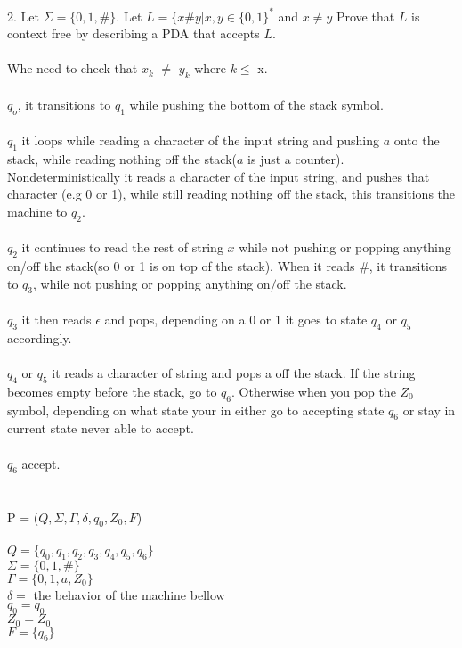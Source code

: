 \documentclass[11pt, oneside]{article}   	%
\begin{document}
\\
\\2. Let $\Sigma = \{ 0,1,\# \}$. Let $L = \{ x \# y | x,y \in \{ 0,1 \}^*$ and $x \neq y$ Prove that $L$ is context free by describing a PDA that accepts $L$.
\\
\\Whe need to check that $x_k$ $\neq$ $y_k$ where $k \leq$ x.
\\
\\$q_o$, it transitions to $q_1$ while pushing the bottom of the stack symbol. 
\\
\\$q_1$ it loops while reading a character of the input string and pushing $a$ onto the stack, while reading nothing off the stack($a$ is just a counter). Nondeterministically it reads a character of the input string, and pushes that character (e.g 0 or 1), while still reading nothing off the stack, this transitions the machine to $q_2$. 
\\
\\$q_2$ it continues to read the rest of string $x$ while not pushing or popping anything on/off the stack(so 0 or 1 is on top of the stack). When it reads $\#$, it transitions to $q_3$, while not pushing or popping anything on$/$off the stack. 
\\
\\$q_3$ it then reads $\epsilon$ and pops, depending on a 0 or 1 it goes to state $q_4$ or $q_5$ accordingly. 
\\
\\$q_4$ or $q_5$ it reads a character of string and pops a off the stack. If the string becomes empty before the stack, go to $q_6$. Otherwise when you pop the $Z_0$ symbol, depending on what state your in either go to accepting state $q_6$ or stay in current state never able to accept.
\\
\\$q_6$ accept.
\\
\\
\\P = ($Q,\Sigma,\Gamma, \delta,q_0,Z_0,F$)
\\
\\$Q =\{q_0,q_1,q_2,q_3,q_4,q_5,q_6\}$
\\$\Sigma = \{ 0,1,\# \}$
\\$\Gamma = \{ 0,1,a, Z_0\}$
\\$\delta =$ the behavior of the machine bellow
\\$q_0 = q_0$
\\$Z_0 = Z_0$
\\$F = \{q_6\}$
\end{document}
